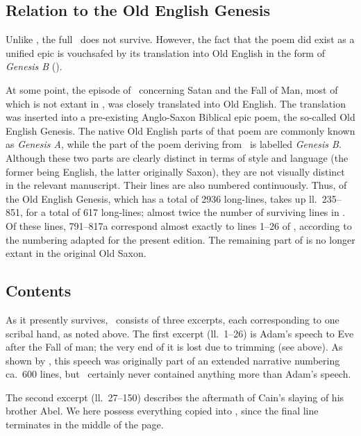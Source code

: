 \subsection{Relation to the Old English Genesis}

Unlike , the full \SaxonGenesis\ does not survive.  However, the fact that the poem did exist as a unified epic is vouchsafed by its translation into Old English in the form of \emph{Genesis B} ().

At some point, the episode of \SaxonGenesis\ concerning Satan and the Fall of Man, most of which is not extant in \Vaticanus, was closely translated into Old English.  The translation was inserted into a pre-existing Anglo-Saxon Biblical epic poem, the so-called Old English Genesis.  The native Old English parts of that poem are commonly known as \emph{Genesis A}, while the part of the poem deriving from \SaxonGenesis\ is labelled \emph{Genesis B}.  Although these two parts are clearly distinct in terms of style and language (the former being English, the latter originally Saxon), they are not visually distinct in the relevant manuscript.  Their lines are also numbered continuously.  Thus, of the Old English Genesis, which has a total of 2936 long-lines,  takes up ll.~235--851, for a total of 617 long-lines; almost twice the number of surviving lines in \SaxonGenesis.  Of these lines, 791--817a correspond almost exactly to lines 1--26 of \SaxonGenesis, according to the numbering adapted for the present edition.  The remaining part of  is no longer extant in the original Old Saxon.

\subsection{Contents}

As it presently survives, \SaxonGenesis\ consists of three excerpts, each corresponding to one scribal hand, as noted above.  The first excerpt (ll.~1--26) is Adam’s speech to Eve after the Fall of man; the very end of it is lost due to trimming (see above).  As shown by , this speech was originally part of an extended narrative numbering ca.~600 lines, but \Vaticanus\ certainly never contained anything more than Adam’s speech.

The second excerpt (ll.~27--150) describes the aftermath of Cain’s slaying of his brother Abel.  We here possess everything copied into \Vaticanus, since the final line terminates in the middle of the page.

